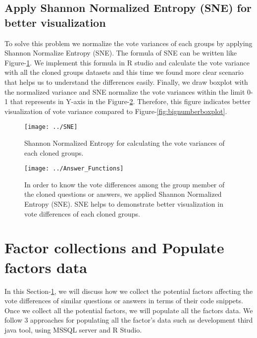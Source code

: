 \documentclass[conference]{IEEEtran}
\begin{document}
	\subsection{Apply Shannon Normalized Entropy (SNE) for better visualization}
	To solve this problem we normalize the vote variances of each groups by applying  Shannon Normalize Entropy (SNE). The formula of SNE can be written like Figure-\ref{fig:sne}. We implement this formula in R studio and calculate the vote variance with all the cloned groups datasets and this time we found more clear scenario that helps us to understand the differences easily. Finally, we draw boxplot with the normalized variance and SNE normalize the vote variances within the limit 0-1 that represents in Y-axis in the Figure-\ref{fig:answerfunctions}. Therefore, this figure indicates better visualization of vote variance compared to Figure-\ref{fig:bignumberboxplot}. 
	\begin{figure}
		\centering
		\texttt{[image: ../SNE]}
		\caption{Shannon Normalized Entropy for calculating the vote variances of each cloned groups.}
		\label{fig:sne}
	\end{figure}
	\begin{figure}
		\centering
		\texttt{[image: ../Answer\_Functions]}
		\caption{ In order to know the vote differences among the group member of the cloned questions or answers, we applied Shannon Normalized Entropy (SNE). SNE helps to demonstrate better visualization in vote differences of each cloned groups.}
		\label{fig:answerfunctions}
	\end{figure}
	
	
	
	\section{Factor collections and Populate factors data} \label{FCMM}
	In this Section-\ref{FCMM}, we will discuss how we collect the potential factors affecting the vote differences of similar questions or answers in terms of their code snippets. Once we collect all the potential factors, we will populate all the factors data. We follow 3  approaches for populating all the factor's data such as development third java tool, using MSSQL server and R Studio. 
	
\end{document}
